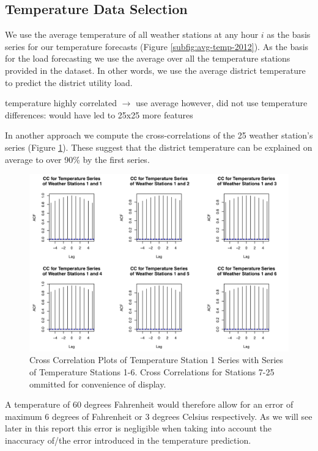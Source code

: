 \documentclass[conference]{IEEEtran}
\begin{document}
\subsection{Temperature Data Selection}
We use the average temperature of all weather stations at any hour $i$ as the basis series for our temperature forecasts (Figure \ref{subfig:avg-temp-2012}).
As the basis for the load forecasting we use the average over all the temperature stations provided in the dataset. In other words, we use the average district temperature to predict the district utility load.\par

\cite{Fan2010} temperature highly correlated $\rightarrow$ use average
however, did not use temperature differences: would have led to 25x25 more features

In another approach we compute the cross-correlations of the 25 weather station's series (Figure \ref{fig:temp-stations-cc}). These suggest that the district temperature can be explained on average to over 90\% by the first series.\par
\begin{figure}[ht!]
\centering
\includegraphics[width=\linewidth]{gfx/weather-station-cc-plots_series1-6_lag5.pdf}
\caption{Cross Correlation Plots of Temperature Station 1 Series with Series of Temperature Stations 1-6. Cross Correlations for Stations 7-25 ommitted for convenience of display.}
\label{fig:temp-stations-cc}
\end{figure}
A temperature of 60 degrees Fahrenheit would therefore allow for an error of maximum 6 degrees of Fahrenheit or 3 degrees Celsius respectively. As we will see later in this report this error is negligible when taking into account the inaccuracy of/the error introduced in the temperature prediction.\par
\end{document}
